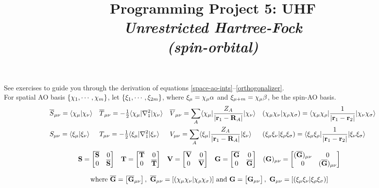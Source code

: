 \documentclass[fleqn]{article}
\title{Programming Project 5: UHF\\
\textit{Unrestricted Hartree-Fock\\(spin-orbital)}}
\author{}
\date{}
\begin{document}
\maketitle
\vspace{-1cm}
\noindent
See exercises to guide you through the derivation of equations \ref{space-ao-ints}--\ref{orthogonalizer}.\\

\noindent
{}
For spatial AO basis $\{\chi_1,\cdots,\chi_m\}$, let $\{\xi_1,\cdots,\xi_{2m}\}$, where $\xi_\mu=\chi_\mu\alpha$ and $\xi_{\mu+m}=\chi_\mu\beta$, be the spin-AO basis.
\begin{gather}
\begin{aligned}
\label{space-ao-ints}
&
  \overline{S}_{\mu\nu}
=
  \langle\chi_{\mu}|\chi_{\nu}\rangle
&&
  \overline{T}_{\mu\nu}
=
  -\tfrac{1}{2}\langle\chi_{\mu}|\nabla_1^2|\chi_{\nu}\rangle
&&
  \overline{V}_{\mu\nu}
=
  \sum_A\langle\chi_{\mu}|\dfrac{Z_A}{|\mathbf{r}_1-\mathbf{R}_A|}|\chi_{\nu}\rangle
&&
  (\chi_\mu\chi_\nu|\chi_\rho\chi_\sigma)
=
  \langle\chi_\mu\chi_\rho|\dfrac{1}{|\mathbf{r}_1-\mathbf{r}_2|}|\chi_\nu\chi_\sigma\rangle
\\
&
  S_{\mu\nu}
=
  \langle\xi_{\mu}|\xi_{\nu}\rangle
&&
  T_{\mu\nu}
=
  -\tfrac{1}{2}\langle\xi_{\mu}|\nabla_1^2|\xi_{\nu}\rangle
&&
  V_{\mu\nu}
=
  \sum_A\langle\xi_{\mu}|\dfrac{Z_A}{|\mathbf{r}_1-\mathbf{R}_A|}|\xi_{\nu}\rangle
&&
  (\xi_\mu\xi_\nu|\xi_\rho\xi_\sigma)
=
  \langle\xi_\mu\xi_\rho|\dfrac{1}{|\mathbf{r}_1-\mathbf{r}_2|}|\xi_\nu\xi_\sigma\rangle
\end{aligned}\\[5pt]
\begin{aligned}
\label{spin-ao-ints-1}
&
  \mathbf{S}
=
  \begin{bmatrix}\overline{\mathbf{S}}&0\\0&\overline{\mathbf{S}}\end{bmatrix}
&&
  \mathbf{T}
=
  \begin{bmatrix}\overline{\mathbf{T}}&0\\0&\overline{\mathbf{T}}\end{bmatrix}
&&
  \mathbf{V}
=
  \begin{bmatrix}\overline{\mathbf{V}}&0\\0&\overline{\mathbf{V}}\end{bmatrix}
&&
  \mathbf{G}
=
  \begin{bmatrix}\overline{\mathbf{G}}&0\\0&\overline{\mathbf{G}}\end{bmatrix}
&&
  (\mathbf{G})_{\mu\nu}
=
  \begin{bmatrix}(\overline{\mathbf{G}})_{\mu\nu}&0\\0&(\overline{\mathbf{G}})_{\mu\nu}\end{bmatrix}
\end{aligned}\\[7pt]
\begin{aligned}
\label{spin-ao-ints-2}
&
\text{where}
\
  \overline{\mathbf{G}}
=
  \begin{bmatrix}\overline{\mathbf{G}}_{\mu\nu}\end{bmatrix},
\
  \overline{\mathbf{G}}_{\mu\nu}
=
  [(\chi_\mu\chi_\nu|\chi_\rho\chi_\sigma)]
\
\text{and}
\
  \mathbf{G}
=
  \begin{bmatrix}\mathbf{G}_{\mu\nu}\end{bmatrix},
\
  \mathbf{G}_{\mu\nu}
=
  [(\xi_\mu\xi_\nu|\xi_\rho\xi_\sigma)]
\end{aligned}
\end{gather}
\end{document}
